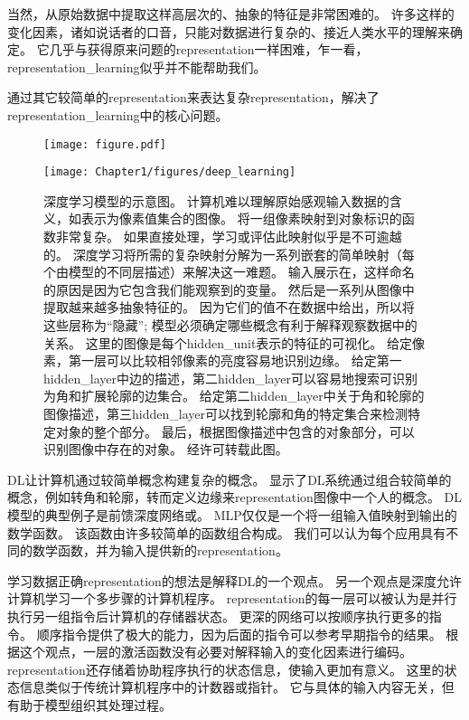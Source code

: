 当然，从原始数据中提取这样高层次的、抽象的特征是非常困难的。
许多这样的变化因素，诸如说话者的口音，只能对数据进行复杂的、接近人类水平的理解来确定。
它几乎与获得原来问题的\gls{representation}一样困难，乍一看，\gls{representation_learning}似乎并不能帮助我们。

通过其它较简单的\gls{representation}来表达复杂\gls{representation}，解决了\gls{representation_learning}中的核心问题。

\begin{figure}[!htb]
\ifOpenSource
\centerline{\texttt{[image: figure.pdf]}}
\else
\centerline{\texttt{[image: Chapter1/figures/deep\_learning]}}
\fi
\caption{深度学习模型的示意图。 计算机难以理解原始感观输入数据的含义，如表示为像素值集合的图像。
将一组像素映射到对象标识的函数非常复杂。
如果直接处理，学习或评估此映射似乎是不可逾越的。
深度学习将所需的复杂映射分解为一系列嵌套的简单映射（每个由模型的不同层描述）来解决这一难题。
输入展示在，这样命名的原因是因为它包含我们能观察到的变量。
然后是一系列从图像中提取越来越多抽象特征的。
因为它们的值不在数据中给出，所以将这些层称为``隐藏''; 模型必须确定哪些概念有利于解释观察数据中的关系。
这里的图像是每个\gls{hidden_unit}表示的特征的可视化。
给定像素，第一层可以比较相邻像素的亮度容易地识别边缘。
给定第一\gls{hidden_layer}中边的描述，第二\gls{hidden_layer}可以容易地搜索可识别为角和扩展轮廓的边集合。
给定第二\gls{hidden_layer}中关于角和轮廓的图像描述，第三\gls{hidden_layer}可以找到轮廓和角的特定集合来检测特定对象的整个部分。
最后，根据图像描述中包含的对象部分，可以识别图像中存在的对象。
经\citet{ZeilerFergus14}许可转载此图。
}
\label{fig:chap1_deep_learning}
\end{figure}

\gls{DL}让计算机通过较简单概念构建复杂的概念。
显示了\gls{DL}系统通过组合较简单的概念，例如转角和轮廓，转而定义边缘来\gls{representation}图像中一个人的概念。
\gls{DL}模型的典型例子是前馈深度网络或。
\gls{MLP}仅仅是一个将一组输入值映射到输出的数学函数。
该函数由许多较简单的函数组合构成。
我们可以认为每个应用具有不同的数学函数，并为输入提供新的\gls{representation}。

学习数据正确\gls{representation}的想法是解释\gls{DL}的一个观点。
另一个观点是深度允许计算机学习一个多步骤的计算机程序。
\gls{representation}的每一层可以被认为是并行执行另一组指令后计算机的存储器状态。
更深的网络可以按顺序执行更多的指令。
顺序指令提供了极大的能力，因为后面的指令可以参考早期指令的结果。
根据这个观点，一层的激活函数没有必要对解释输入的变化因素进行编码。
\gls{representation}还存储着协助程序执行的状态信息，使输入更加有意义。
这里的状态信息类似于传统计算机程序中的计数器或指针。
它与具体的输入内容无关，但有助于模型组织其处理过程。

